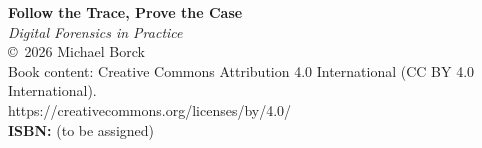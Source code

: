 \thispagestyle{empty}
\vspace*{2in}
\begin{center}
\textbf{\large Follow the Trace, Prove the Case}\\[0.3em]
\textit{Digital Forensics in Practice}\\[1em]
\copyright\ 2026 Michael Borck\\[0.5em]
Book content: Creative Commons Attribution 4.0 International (CC BY 4.0 International).\\
https://creativecommons.org/licenses/by/4.0/\\[1em]
\textbf{ISBN:} (to be assigned)\\[1em]
\end{center}
\clearpage
